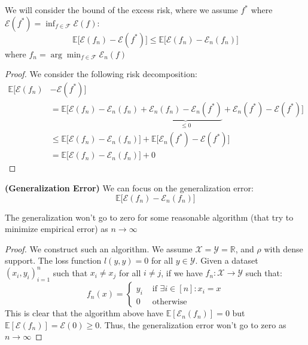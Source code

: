 \begin{proposition}
    We will consider the bound of the excess risk, where we assume $f^*$ where $\mathcal{E}(f^*) = \inf_{f\in\mathcal{F}}\mathcal{E}(f)$:
    \begin{equation*}
        \mathbb{E}\Big[\mathcal{E}(f_n) - \mathcal{E}(f^*)\Big] \le \mathbb{E}\Big[ \mathcal{E}(f_n) - \mathcal{E}_n(f_n) \Big]
    \end{equation*}
    where $f_n = \arg\min_{f\in\mathcal{F}}\mathcal{E}_n(f)$
\end{proposition}
\begin{proof}
    We consider the following risk decomposition:
    \begin{equation*}
    \begin{aligned}
        \mathbb{E}\Big[\mathcal{E}(f_n) &- \mathcal{E}(f^*)\Big] \\
        &= \mathbb{E}\Big[\mathcal{E}(f_n) - \mathcal{E}_n(f_n) + \underbrace{\mathcal{E}_n(f_n) - \mathcal{E}_n(f^*)}_{\le 0} + \mathcal{E}_n(f^*) - \mathcal{E}(f^*)\Big] \\
        &\le \mathbb{E}\Big[\mathcal{E}(f_n) - \mathcal{E}_n(f_n)\Big] + \mathbb{E}\Big[\mathcal{E}_n(f^*) - \mathcal{E}(f^*)\Big] \\
        &= \mathbb{E}\Big[\mathcal{E}(f_n) - \mathcal{E}_n(f_n)\Big] + 0
    \end{aligned}
    \end{equation*}
\end{proof}

\begin{definition}{\textbf{(Generalization Error)}}
    We can focus on the generalization error:
    \begin{equation*}
        \mathbb{E}\Big[ \mathcal{E}(f_n) - \mathcal{E}_n(f_n) \Big]
    \end{equation*}
\end{definition}

\begin{proposition}
    The generalization won't go to zero for some reasonable algorithm (that try to minimize empirical error) as $n\rightarrow\infty$
\end{proposition}
\begin{proof}
    We construct such an algorithm. We assume $\mathcal{X} = \mathcal{Y} = \mathbb{R}$, and $\rho$ with dense support. The loss function $l(y,y)=0$ for all $y\in\mathcal{Y}$. Given a dataset $(x_i, y_i)^n_{i=1}$ such that $x_i \ne x_j$ for all $i\ne j$, if we have $f_n:\mathcal{X}\rightarrow\mathcal{Y}$ such that:
    \begin{equation*}
        f_n(x) = \begin{cases}
            y_i & \text{ if } \exists i \in [n] : x_i = x \\
            0 & \text{ otherwise }
        \end{cases}
    \end{equation*}
    This is clear that the algorithm above have $\mathbb{E}[\mathcal{E}_n(f_n)] = 0 $ but $\mathbb{E}[\mathcal{E}(f_n)] = \mathcal{E}(0)\ge0$. Thus, the generalization error won't go to zero as $n\rightarrow\infty$
\end{proof}

